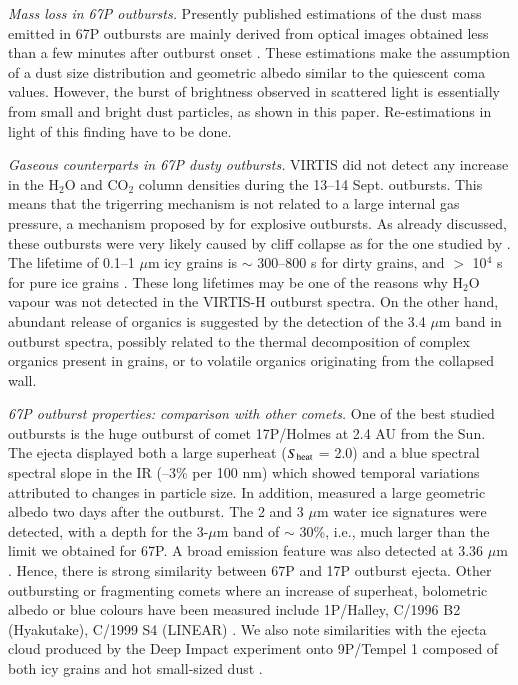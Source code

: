 \documentclass[a4paper,fleqn,usenatbib]{mnras}
\begin{document}
{\it Mass loss in 67P outbursts.} Presently published estimations of the dust mass emitted in 67P outbursts are mainly derived from optical images obtained less than a few minutes after outburst onset \citep{Knollenberg2016,Vincent2016b}. These estimations make the assumption of a dust size distribution and geometric albedo similar to the quiescent coma values. However, the burst of brightness observed in scattered light is essentially from small and bright dust particles, as shown in this paper. Re-estimations in light of this finding have to be done.

{\it Gaseous counterparts in 67P dusty outbursts.} VIRTIS did not detect any increase in the H$_2$O and CO$_2$ column densities during the 13--14 Sept. outbursts. This means that the trigerring mechanism is not related to a large internal gas pressure, a mechanism proposed by \citet{Prialnik1993} for explosive outbursts. As already discussed, these outbursts were very likely caused by cliff collapse as for the one studied by  \citet{Pajola2017}. The lifetime of 0.1--1 $\mu$m icy grains is $\sim$ 300--800 s for dirty grains, and $>$ 10$^4$ s for pure ice grains \citep{Beer2006,Gicquel2012}. These long lifetimes may be one of the reasons why H$_2$O vapour was not detected in the VIRTIS-H outburst spectra. On the other hand, abundant release of organics is suggested by the detection of the 3.4 $\mu$m band in outburst spectra, possibly related to the thermal decomposition of complex organics present in grains, or to volatile organics originating from the collapsed wall.

{\it 67P outburst properties: comparison with other comets.} One of the best studied outbursts is the huge outburst of comet 17P/Holmes at 2.4 AU from the Sun. The ejecta displayed both a large superheat ($S_{\rm heat}$ = 2.0) and a blue spectral spectral slope in the IR (--3\% per 100 nm) \citep{Yang2009} which showed temporal variations attributed to changes in particle size. In addition, \citet{Ishiguro2010} measured a large geometric albedo two days after the outburst. The 2 and 3 $\mu$m water ice signatures were detected, with a depth for the 3-$\mu$m band of $\sim$ 30\%, i.e., much larger than the limit we obtained for 67P. A broad emission feature was also detected at 3.36 $\mu$m \citep{Yang2009}. Hence, there is strong similarity between 67P and 17P outburst ejecta. Other outbursting or fragmenting comets where an increase of superheat, bolometric albedo or blue colours have been measured include 1P/Halley, C/1996 B2 (Hyakutake), C/1999 S4 (LINEAR) \citep{Gehrz1995,Mason1998,Bonev2002}. We also note  similarities with the ejecta cloud produced by the Deep Impact experiment onto 9P/Tempel 1 composed of both icy grains and hot small-sized dust  \citep[e.g.,][]{Sunshine2007,Gicquel2012}.
\end{document}
